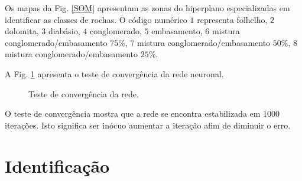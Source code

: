 Os mapas da Fig. \ref{SOM} apresentam as zonas do hiperplano especializadas em identificar as classes de rochas. O código numérico $1$ representa folhelho, $2$ dolomita, $3$ diabásio, $4$ conglomerado, $5$ embasamento, $6$ mistura conglomerado/embasamento $75\%$, $7$ mistura conglomerado/embasamento $50\%$, $8$ mistura conglomerado/embasamento $25\%$.

A Fig. \ref{convergencia} apresenta o teste de convergência da rede neuronal.

\begin{figure}[H]
	\centering
	\setlength{\fboxsep}{8pt}
	\setlength{\fboxrule}{0.1pt}
	\caption{Teste de convergência da rede.}
	\label{convergencia}
\end{figure} 

O teste de convergência mostra que a rede se encontra estabilizada em  $1000$ iterações. Isto significa ser inócuo aumentar a iteração afim de diminuir o erro. 



\section{Identificação}




